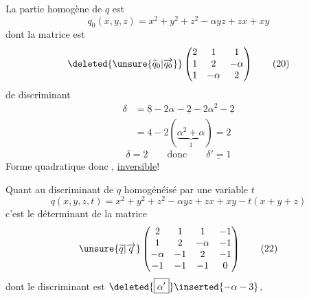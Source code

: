 La partie homogène de $q$ est
\[
q_0(x,y,z)=x^2+y^2+z^2-\alpha yz+zx+xy\tag*{(19)}
\]
dont la matrice est
\[
\deleted{\unsure{\widetilde q_0|\overrightarrow{q_0}}}
\begin{pmatrix}2&1&1\\1&2&-\alpha\\1&-\alpha&2\end{pmatrix}\tag*{(20)}
\]
de discriminant
\[
\begin{aligned}
\delta&=\underline{8}-2\alpha-\underline{2}-2\alpha^2-\underline{2}\\
&=4-2(\underbrace{\alpha^2+\alpha}_{1})=2
\end{aligned}
\]
\[
\delta=2\qquad\text{donc}\qquad\underline{\delta'=1}\tag*{(21)}
\]
Forme quadratique donc , \uline{inversible}!

Quant au discriminant de $q$ homogénéisé par une variable $t$
\[
q(x,y,z,t)=x^2+y^2+z^2-\alpha yz+zx+xy-t(x+y+z)
\]
c'est le déterminant de la matrice
\[
\unsure{\widetilde q|\overrightarrow q}
\begin{pmatrix}
2&1&1&-1\\
1&2&-\alpha&-1\\
-\alpha&-1&2&-1\\
-1&-1&-1&0
\end{pmatrix}\tag*{(22)}
\]
dont le discriminant  est
$\deleted{\boxed{\alpha'}}\inserted{-\alpha-3}$,
